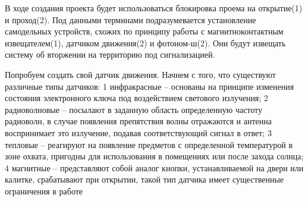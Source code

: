 В ходе создания проекта будет использоваться блокировка проема на открытие(1) и проход(2). Под данными терминами подразумевается установление 
самодельных устройств, схожих по принципу работы с магнитноконтактным извещателем(1), датчиком движения(2) и фотоном-ш(2). Они будут извещать 
систему об вторжении на территорию под сигнализацией. 

Попробуем создать свой датчик движения. Начнем с того, что существуют различные типы датчиков:
1 инфракрасные – основаны на принципе изменения состояния электронного ключа под воздействием светового излучения;
2 радиоволновые – посылают в заданную область определенную частоту радиоволн, в случае появления препятствия волны отражаются и антенна воспринимает 
это излучение, подавая соответствующий сигнал в ответ;
3 тепловые – реагируют на появление предметов с определенной температурой в зоне охвата, пригодны для использования в помещениях или после захода солнца;
4 магнитные – представляют собой аналог кнопки, устанавливаемой на двери или калитке, срабатывают при открытии, такой тип датчика имеет существенные 
ограничения в работе
